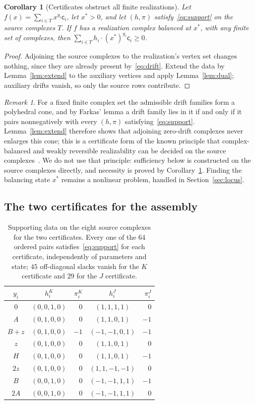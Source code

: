 \documentclass[11pt,a4paper]{article}
\theoremstyle{plain}
\newtheorem{corollary}[theorem]{Corollary}
\theoremstyle{definition}
\theoremstyle{remark}
\newtheorem{remark}[theorem]{Remark}
\newcommand{\cc}{\mathsf{c}}
\newcommand{\xs}{x^{*}}
\begin{document}
\begin{corollary}[Certificates obstruct all finite realizations]\label{cor:obstruct}
Let $f(x)=\sum_{i\in T}x^{y_i}\cc_i$, let $\xs>0$, and let $(h,\pi)$ satisfy~\eqref{eq:support} on the source complexes $T$. If $f$ has a realization complex balanced at $\xs$, with any finite set of complexes, then $\sum_{i\in T}h_i\cdot(\xs)^{y_i}\cc_i\ge0$.
\end{corollary}
\begin{proof}
Adjoining the source complexes to the realization's vertex set changes nothing, since they are already present by~\eqref{eq:drift}. Extend the data by Lemma~\ref{lem:extend} to the auxiliary vertices and apply Lemma~\ref{lem:dual}; auxiliary drifts vanish, so only the source rows contribute.
\end{proof}

\begin{remark}\label{rem:farkas}
For a fixed finite complex set the admissible drift families form a polyhedral cone, and by Farkas' lemma a drift family lies in it if and only if it pairs nonnegatively with every $(h,\pi)$ satisfying~\eqref{eq:support}. Lemma~\ref{lem:extend} therefore shows that adjoining zero-drift complexes never enlarges this cone; this is a certificate form of the known principle that complex-balanced and weakly reversible realizability can be decided on the source complexes~\cite{CraciunJinYu2020}. We do not use that principle: sufficiency below is constructed on the source complexes directly, and necessity is proved by Corollary~\ref{cor:obstruct}. Finding the balancing state $\xs$ remains a nonlinear problem, handled in Section~\ref{sec:locus}.
\end{remark}

\subsection{The two certificates for the assembly}

\begin{table}[htbp]\centering
\caption{Supporting data on the eight source complexes for the two certificates. Every one of the $64$ ordered pairs satisfies~\eqref{eq:support} for each certificate, independently of parameters and state; $45$ off-diagonal slacks vanish for the $K$ certificate and $29$ for the $J$ certificate.}\label{tab:dual}
\begin{tabular}{c c r c r}\toprule
$y_i$&$h_i^K$&$\pi_i^K$&$h_i^J$&$\pi_i^J$\\\midrule
$0$&$(0,0,1,0)$&$0$&$(1,1,1,1)$&$0$\\
$A$&$(0,1,0,0)$&$0$&$(1,1,0,1)$&$-1$\\
$B+z$&$(0,1,0,0)$&$-1$&$(-1,-1,0,1)$&$-1$\\
$z$&$(0,1,0,0)$&$0$&$(1,1,0,1)$&$0$\\
$H$&$(0,1,0,0)$&$0$&$(1,1,0,1)$&$-1$\\
$2z$&$(0,1,0,0)$&$0$&$(1,1,-1,-1)$&$0$\\
$B$&$(0,0,1,0)$&$0$&$(-1,-1,1,1)$&$-1$\\
$2A$&$(0,0,1,0)$&$0$&$(-1,-1,1,1)$&$0$\\\bottomrule
\end{tabular}
\end{table}
\end{document}
